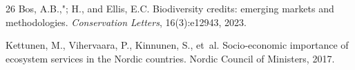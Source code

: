 \begin{thebibliography}{26}
Bos, A.B.,"; H., and Ellis, E.C.
\newblock Biodiversity credits: emerging markets and methodologies.
\newblock \emph{Conservation Letters}, 16(3):e12943, 2023.

Kettunen, M., Vihervaara, P., Kinnunen, S., et~al.
\newblock Socio-economic importance of ecosystem services in the Nordic countries.
\newblock Nordic Council of Ministers, 2017.

\end{thebibliography}

